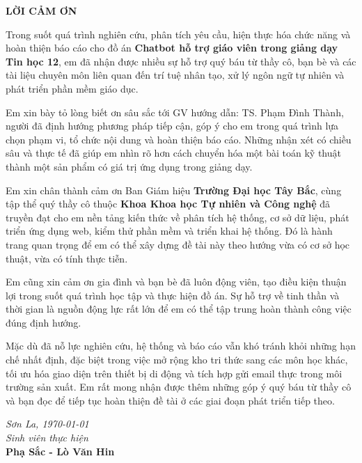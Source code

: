 \documentclass[12pt,a4paper]{article}
\newcommand{\studentname}{Phạ Sắc - Lò Văn Hin}
\newcommand{\advisorname}{GV hướng dẫn: TS. Phạm Đình Thành}
\begin{document}
	\newpage
	\thispagestyle{empty}
	\begin{center}
		\fontsize{14pt}{20pt}\selectfont
		\textbf{LỜI CẢM ƠN}
	\end{center}
	
	\vspace{20pt}
	
	Trong suốt quá trình nghiên cứu, phân tích yêu cầu, hiện thực hóa chức năng và hoàn thiện báo cáo cho đồ án \textbf{Chatbot hỗ trợ giáo viên trong giảng dạy Tin học 12}, em đã nhận được nhiều sự hỗ trợ quý báu từ thầy cô, bạn bè và các tài liệu chuyên môn liên quan đến trí tuệ nhân tạo, xử lý ngôn ngữ tự nhiên và phát triển phần mềm giáo dục.
	
	Em xin bày tỏ lòng biết ơn sâu sắc tới \advisorname, người đã định hướng phương pháp tiếp cận, góp ý cho em trong quá trình lựa chọn phạm vi, tổ chức nội dung và hoàn thiện báo cáo. Những nhận xét có chiều sâu và thực tế đã giúp em nhìn rõ hơn cách chuyển hóa một bài toán kỹ thuật thành một sản phẩm có giá trị ứng dụng trong giảng dạy.
	
	Em xin chân thành cảm ơn Ban Giám hiệu \textbf{Trường Đại học Tây Bắc}, cùng tập thể quý thầy cô thuộc \textbf{Khoa Khoa học Tự nhiên và Công nghệ} đã truyền đạt cho em nền tảng kiến thức về phân tích hệ thống, cơ sở dữ liệu, phát triển ứng dụng web, kiểm thử phần mềm và triển khai hệ thống. Đó là hành trang quan trọng để em có thể xây dựng đề tài này theo hướng vừa có cơ sở học thuật, vừa có tính thực tiễn.
	
	Em cũng xin cảm ơn gia đình và bạn bè đã luôn động viên, tạo điều kiện thuận lợi trong suốt quá trình học tập và thực hiện đồ án. Sự hỗ trợ về tinh thần và thời gian là nguồn động lực rất lớn để em có thể tập trung hoàn thành công việc đúng định hướng.
	
	Mặc dù đã nỗ lực nghiên cứu, hệ thống và báo cáo vẫn khó tránh khỏi những hạn chế nhất định, đặc biệt trong việc mở rộng kho tri thức sang các môn học khác, tối ưu hóa giao diện trên thiết bị di động và tích hợp gửi email thực trong môi trường sản xuất. Em rất mong nhận được thêm những góp ý quý báu từ thầy cô và bạn đọc để tiếp tục hoàn thiện đề tài ở các giai đoạn phát triển tiếp theo.
	
	\vspace{30pt}
	
	\begin{flushright}
		\textit{Sơn La, \today}\\[10pt]
		\textit{Sinh viên thực hiện}\\[30pt]
		\textbf{\studentname}
	\end{flushright}
	
\end{document}
